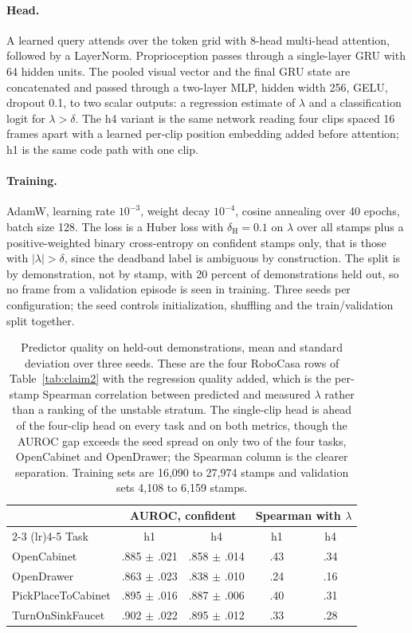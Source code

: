 \paragraph{Head.}
A learned query attends over the token grid with 8-head multi-head attention,
followed by a LayerNorm. Proprioception passes through a single-layer GRU with
64 hidden units. The pooled visual vector and the final GRU state are
concatenated and passed through a two-layer MLP, hidden width 256, GELU,
dropout 0.1, to two scalar outputs: a regression estimate of $\lambda$ and a
classification logit for $\lambda > \delta$. The h4 variant is the same network
reading four clips spaced 16 frames apart with a learned per-clip position
embedding added before attention; h1 is the same code path with one clip.

\paragraph{Training.}
AdamW, learning rate $10^{-3}$, weight decay $10^{-4}$, cosine annealing over
40 epochs, batch size 128. The loss is a Huber loss with $\delta_{\text{H}}{=}0.1$
on $\lambda$ over all stamps plus a positive-weighted binary cross-entropy on
confident stamps only, that is those with $\lvert\lambda\rvert > \delta$, since
the deadband label is ambiguous by construction. The split is by demonstration,
not by stamp, with 20 percent of demonstrations held out, so no frame from a
validation episode is seen in training. Three seeds per configuration; the seed
controls initialization, shuffling and the train/validation split together.

\begin{table}[h]
\centering
\small
\begin{tabular}{lcccc}
\toprule
& \multicolumn{2}{c}{AUROC, confident} & \multicolumn{2}{c}{Spearman with $\lambda$} \\
\cmidrule(lr){2-3} \cmidrule(lr){4-5}
Task & h1 & h4 & h1 & h4 \\
\midrule
OpenCabinet & .885 $\pm$ .021 & .858 $\pm$ .014 & .43 & .34 \\
OpenDrawer & .863 $\pm$ .023 & .838 $\pm$ .010 & .24 & .16 \\
PickPlaceToCabinet & .895 $\pm$ .016 & .887 $\pm$ .006 & .40 & .31 \\
TurnOnSinkFaucet & .902 $\pm$ .022 & .895 $\pm$ .012 & .33 & .28 \\
\bottomrule
\end{tabular}
\caption{Predictor quality on held-out demonstrations, mean and standard
deviation over three seeds. These are the four RoboCasa rows of
Table~\ref{tab:claim2} with the regression quality added, which is the
per-stamp Spearman correlation between predicted and measured $\lambda$ rather
than a ranking of the unstable stratum. The single-clip head is ahead of the
four-clip head on every task and on both metrics, though the AUROC gap exceeds
the seed spread on only two of the four tasks, OpenCabinet and OpenDrawer; the
Spearman column is the clearer separation. Training sets are 16{,}090 to
27{,}974 stamps and validation sets 4{,}108 to 6{,}159 stamps.}
\label{tab:predfull}
\end{table}

